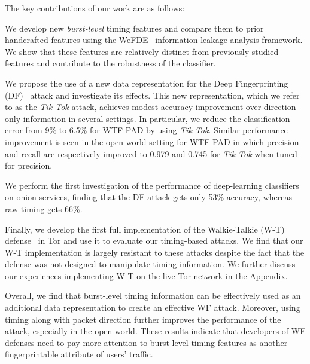 \documentclass[USenglish,oneside,twocolumn]{article}
\newenvironment{smitemize}
  {\begin{list}{--}
     {\setlength{\parsep}{0pt}
      \setlength{\leftmargin}{15pt}
      \setlength{\topsep}{-2pt}
      \setlength{\labelwidth}{5pt}
      \setlength{\itemsep}{1pt}}}
  {\end{list}}
\begin{document}
The key contributions of our work are as follows:
\begin{smitemize}
    \item We develop new \emph{burst-level} timing features and compare them to prior handcrafted features using the WeFDE~\cite{infoleak} information leakage analysis framework. We show that these features are relatively distinct from previously studied features and contribute to the robustness of the classifier.






    \item We propose the use of a new data representation for the Deep Fingerprinting (DF)~\cite{Sirinam2018} attack and investigate its effects. This new representation, which we refer to as the \emph{Tik-Tok} attack, achieves modest accuracy improvement over direction-only information in several settings. In particular, we reduce the classification error from 9\% to 6.5\% for WTF-PAD by using \emph{Tik-Tok}. Similar performance improvement is seen in the open-world setting for WTF-PAD in which precision and recall are  respectively improved to 0.979 and 0.745 for \emph{Tik-Tok} when tuned for precision. 

    \item We perform the first investigation of the performance of deep-learning classifiers on onion services, finding that the DF attack gets only 53\% accuracy, whereas raw timing gets 66\%.








    \item Finally, we develop the first full implementation of the Walkie-Talkie (W-T) defense~\cite{wang2017walkie} in Tor and use it to evaluate our timing-based attacks. We find that our W-T implementation is largely resistant to these attacks despite the fact that the defense was not designed to manipulate timing information. We further discuss our experiences implementing W-T on the live Tor network in the Appendix.










\end{smitemize}
\vspace{0.5cm}
Overall, we find that burst-level timing information can be effectively used as an additional data representation to create an effective WF attack. Moreover, using timing along with packet direction further improves the performance of the attack, especially in the open world. These results indicate that developers of WF defenses need to pay more attention to burst-level timing features as another fingerprintable attribute of users' traffic. 
 
\end{document}
